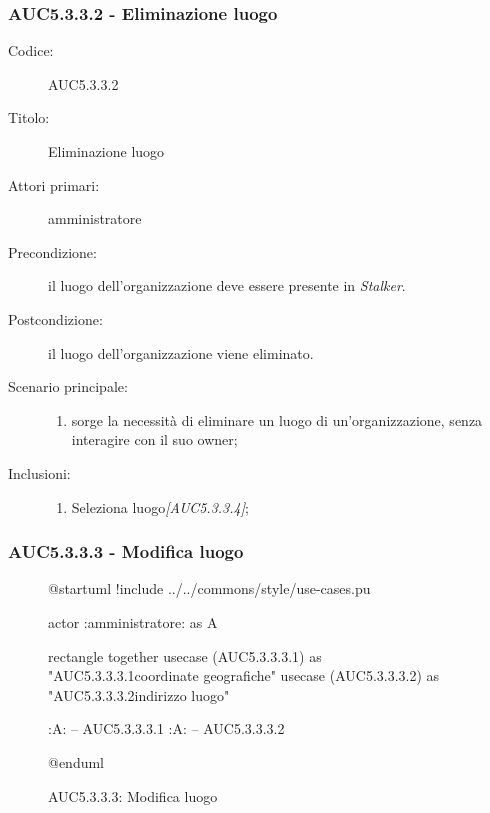 \documentclass[../../../analisi-dei-requisiti.tex]{subfiles}
\begin{document}
\subsubsection{AUC5.3.3.2 - Eliminazione luogo}%
\label{subs:AUC5.3.3.2}
\begin{description}
  \item[Codice:] AUC5.3.3.2
  \item[Titolo:] Eliminazione luogo
  \item[Attori primari:] amministratore
  \item[Precondizione:] il luogo dell'organizzazione deve essere presente in \emph{Stalker}.
  \item[Postcondizione:] il luogo dell'organizzazione viene eliminato.
  \item[Scenario principale:]
  \begin{enumerate}
    \item sorge la necessità di eliminare un luogo di un'organizzazione, senza interagire con il suo owner;
  \end{enumerate}
  \item[Inclusioni:]
  \begin{enumerate}
    \item Seleziona luogo\emph{[AUC5.3.3.4]};
  \end{enumerate}
\end{description}

\subsubsection{AUC5.3.3.3 - Modifica luogo}%
\label{subs:AUC5.3.3.3}

\begin{figure}[h!]
  \centering
  \begin{plantuml}
  @startuml
  !include ../../commons/style/use-cases.pu

  actor :amministratore: as A

  rectangle {
    together {
      usecase (AUC5.3.3.3.1) as "AUC5.3.3.3.1\nModifica coordinate geografiche"
      usecase (AUC5.3.3.3.2) as "AUC5.3.3.3.2\nModifica indirizzo luogo"
    }
  }

  :A: -- AUC5.3.3.3.1
  :A: -- AUC5.3.3.3.2

  @enduml
  \end{plantuml}
  \caption{AUC5.3.3.3: Modifica luogo}
  \label{fig:AUC5_3_3_3}
\end{figure}
\end{document}
